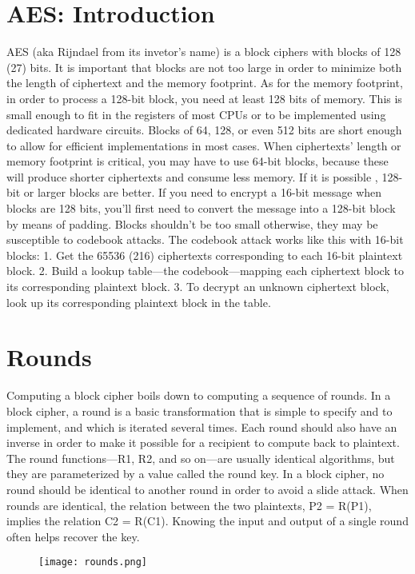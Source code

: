 \documentclass{article}
\begin{document}
 \section{AES: Introduction}
AES (aka Rijndael from its invetor's name) is a block ciphers  with blocks of 128 (27) bits. It is important that blocks are not too large in order to minimize both the length of ciphertext and the memory footprint.
As for the memory footprint, in order to process a 128-bit block, you need at least 128 bits of memory. This is small enough to fit in the registers of most CPUs or to be implemented using dedicated hardware circuits. Blocks of 64, 128, or even 512 bits are short enough to allow for efficient implementations in most cases.
When ciphertexts’ length or memory footprint is critical, you may have to use 64-bit blocks, because these will produce shorter ciphertexts and consume less memory. If it is possible , 128-bit or larger blocks are better. If you need to encrypt a 16-bit message when blocks are 128 bits, you’ll first need to convert the message into a 128-bit block by means of padding. Blocks shouldn’t be too small otherwise, they may be susceptible to codebook attacks. The codebook attack works like this with 16-bit blocks:
1. Get the 65536 (216) ciphertexts corresponding to each 16-bit
plaintext block.
2. Build a lookup table—the codebook—mapping each ciphertext block
to its corresponding plaintext block.
3. To decrypt an unknown ciphertext block, look up its corresponding
plaintext block in the table.
\section*{Rounds}
Computing a block cipher boils down to computing a sequence of rounds.
In a block cipher, a round is a basic transformation that is simple to specify and to implement, and which is iterated several times. Each round should also have an inverse in order to make it possible for a recipient to compute back to plaintext. The round functions—R1, R2, and so on—are usually identical algorithms, but they are parameterized by a value called the round key.
In a block cipher, no round should be identical to another round in order to avoid a slide attack. When rounds are identical, the relation between the two plaintexts, P2 = R(P1), implies the relation C2 = R(C1). Knowing the input and output of a single round often helps recover the key.
\begin{figure}[htb]
	\begin{center}
  		\texttt{[image: rounds.png]} 
 	\end{center}
\end{figure}
\end{document}
